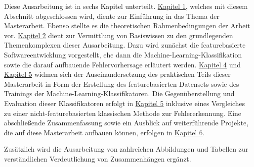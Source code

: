 Diese Ausarbeitung ist in sechs Kapitel unterteilt. \hyperref[introduction]{Kapitel 1}, welches mit diesem Abschnitt abgeschlossen wird, diente zur Einführung in das Thema der Masterarbeit. Ebenso stellte es die theoretischen Rahmenbedingungen der Arbeit vor. \hyperref[background]{Kapitel 2} dient zur Vermittlung von Basiswissen zu den grundlegenden Themenkomplexen dieser Ausarbeitung. Dazu wird zunächst die featurebasierte Softwareentwicklung vorgestellt, ehe dann die Machine-Learning-Klassifikation sowie die darauf aufbauende Fehlervorhersage erläutert werden. \hyperref[dataset-creation]{Kapitel 4} und \hyperref[training]{Kapitel 5} widmen sich der Auseinandersetzung des praktischen Teils dieser Masterarbeit in Form der Erstellung des featurebasierten Datensets sowie des Trainings der Machine-Learning-Klassifikatoren. Die Gegenüberstellung und Evaluation dieser Klassifikatoren erfolgt in \hyperref[evaluation]{Kapitel 5} inklusive eines Vergleiches zu einer nicht-featurebasierten klassischen Methode zur Fehlererkennung. Eine abschließende Zusammenfassung sowie ein Ausblick auf weiterführende Projekte, die auf diese Masterarbeit aufbauen können, erfolgen in \hyperref[conclusion]{Kapitel 6}.

Zusätzlich wird die Ausarbeitung von zahlreichen Abbildungen und Tabellen zur verständlichen Verdeutlichung von Zusammenhängen ergänzt.

\cleardoublepage
